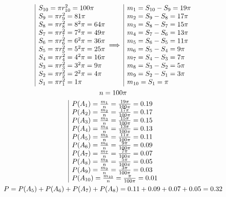 \documentclass[fleqn, 12pt]{article}
\theoremstyle{definition}
\begin{document}
\begin{gather*}
\begin{array}{|l@{}}
S_{10} = \pi r_{10} ^2 = 100\pi \\
S_9 = \pi r_9 ^2 = 81\pi \\
S_8 = \pi r_8 ^2 = 8^2\pi = 64\pi\\
S_7 = \pi r_7 ^2 = 7^2\pi = 49\pi\\
S_6 = \pi r_6 ^2 = 6^2\pi = 36\pi\\
S_5 = \pi r_5 ^2 = 5^2\pi = 25\pi \\
S_4 = \pi r_4 ^2 = 4^2\pi = 16\pi \\
S_3 = \pi r_3 ^2 = 3^2\pi = 9\pi \\
S_2 = \pi r_2 ^2 = 2^2\pi = 4\pi \\
S_1 = \pi r_1 ^2 = 1\pi 
\end{array} \implies
\begin{array}{|l@{}}
m_1 = S_{10} - S_9 = 19\pi \\
m_2 = S_9 - S_8 = 17\pi \\
m_3 = S_8 - S_7 = 15\pi \\
m_4 = S_7 - S_6 = 13\pi \\
m_5 = S_6 - S_5 = 11\pi \\
m_6 = S_5 - S_4 = 9\pi \\
m_7 = S_4 - S_3 = 7\pi \\
m_8 = S_3 - S_2 = 5\pi \\
m_9 = S_2 - S_1 = 3\pi \\
m_{10} = S_1 = \pi
\end{array} \\
n = 100\pi \\
\begin{array}{|l@{}}
P(A_1) = \frac{m_1}{n} = \frac{19\pi}{100\pi} = 0.19 \\
P(A_2) = \frac{m_2}{n} = \frac{17\pi}{100\pi} = 0.17 \\
P(A_3) = \frac{m_3}{n} = \frac{15\pi}{100\pi} = 0.15 \\
P(A_4) = \frac{m_4}{n} = \frac{13\pi}{100\pi} = 0.13 \\
P(A_5) = \frac{m_5}{n} = \frac{11\pi}{100\pi} = 0.11 \\
P(A_6) = \frac{m_6}{n} = \frac{9\pi}{100\pi} = 0.09 \\
P(A_7) = \frac{m_7}{n} = \frac{7\pi}{100\pi} = 0.07 \\
P(A_8) = \frac{m_8}{n} = \frac{5\pi}{100\pi} = 0.05 \\
P(A_9) = \frac{m_9}{n} = \frac{3\pi}{100\pi} = 0.03 \\
P(A_{10}) = \frac{m_{10}}{n} = \frac{\pi}{100\pi} = 0.01 
\end{array} \\
P = P(A_5) + P(A_6) + P(A_7) + P(A_8) = 0.11 + 0.09 + 0.07 + 0.05 = 0.32
\end{gather*}
\end{document}
